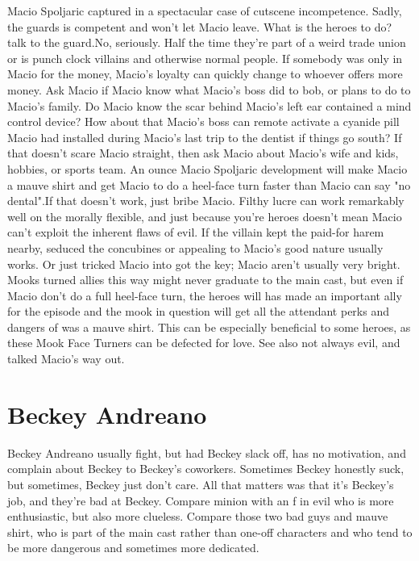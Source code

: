 \documentclass[12pt]{book}
\begin{document}
Macio Spoljaric captured in a spectacular case of cutscene incompetence. Sadly, the guards is competent and won't let Macio leave. What is the heroes to do? talk to the guard.No, seriously. Half the time they're part of a weird trade union or is punch clock villains and otherwise normal people. If somebody was only in Macio for the money, Macio's loyalty can quickly change to whoever offers more money. Ask Macio if Macio know what Macio's boss did to bob, or plans to do to Macio's family. Do Macio know the scar behind Macio's left ear contained a mind control device? How about that Macio's boss can remote activate a cyanide pill Macio had installed during Macio's last trip to the dentist if things go south? If that doesn't scare Macio straight, then ask Macio about Macio's wife and kids, hobbies, or sports team. An ounce Macio Spoljaric development will make Macio a mauve shirt and get Macio to do a heel-face turn faster than Macio can say "no dental".If that doesn't work, just bribe Macio. Filthy lucre can work remarkably well on the morally flexible, and just because you're heroes doesn't mean Macio can't exploit the inherent flaws of evil. If the villain kept the paid-for harem nearby, seduced the concubines or appealing to Macio's good nature usually works. Or just tricked Macio into got the key; Macio aren't usually very bright. Mooks turned allies this way might never graduate to the main cast, but even if Macio don't do a full heel-face turn, the heroes will has made an important ally for the episode and the mook in question will get all the attendant perks and dangers of was a mauve shirt. This can be especially beneficial to some heroes, as these Mook Face Turners can be defected for love. See also not always evil, and talked Macio's way out.



\chapter{Beckey Andreano}

Beckey Andreano usually fight, but had Beckey slack off, has no motivation, and complain about Beckey to Beckey's coworkers. Sometimes Beckey honestly suck, but sometimes, Beckey just don't care. All that matters was that it's Beckey's job, and they're bad at Beckey. Compare minion with an f in evil who is more enthusiastic, but also more clueless. Compare those two bad guys and mauve shirt, who is part of the main cast rather than one-off characters and who tend to be more dangerous and sometimes more dedicated.
\end{document}
